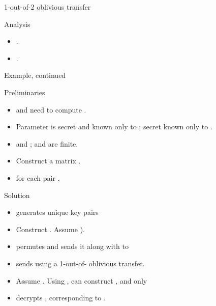  \begin{slide}{1-out-of-2 oblivious transfer}
    \begin{centerfig}
    \end{centerfig}

    \begin{block}{Analysis}
      \begin{itemize}
      \item {}.
      \item {}.
      \end{itemize}
    \end{block}
  \end{slide}
  \begin{slide}{Example, continued}
    \begin{block}{Preliminaries}
      \begin{itemize}
      \item {} and  need to compute .
      \item Parameter  is secret and known only to ; secret  known only to
        .
      \item {} and ;  and
         are finite.
      \item Construct a  matrix .
      \item {} for each pair .
      \end{itemize}
    \end{block}

    \begin{block}{Solution}
      \begin{itemize}
      \item {} generates  unique key pairs
      \item Construct . Assume ).
      \item {} permutes  and sends it along with  to 
      \item {} sends  using a 1-out-of- oblivious transfer.
      \item Assume . Using ,  can construct , and only 
      \item {} decrypts , corresponding to
        .
      \end{itemize}
    \end{block}
  \end{slide}
